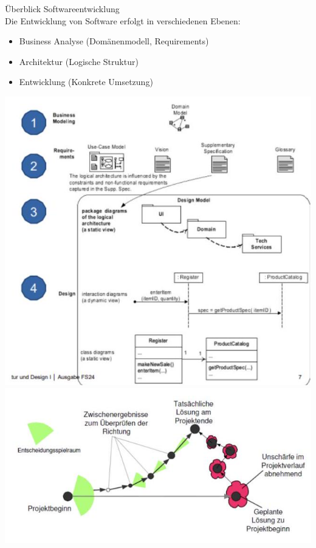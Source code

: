 \begin{concept}{Überblick Softwareentwicklung}\\
Die Entwicklung von Software erfolgt in verschiedenen Ebenen:
\begin{itemize}
    \item Business Analyse (Domänenmodell, Requirements)
    \item Architektur (Logische Struktur)
    \item Entwicklung (Konkrete Umsetzung)
\end{itemize}
\includegraphics[width=\linewidth]{images/2024_12_29_0d1d7b5551ea1b4b41bdg-07(2)}
\includegraphics[width=\linewidth]{images/2024_12_29_0d1d7b5551ea1b4b41bdg-08(1)}
\end{concept}

